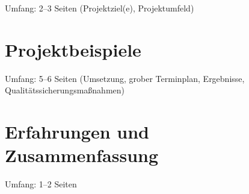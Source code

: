 \documentclass[type=internship,theme=fhooe24,language=german,titlelanguage=german,smartquotes]{hgbthesis}
\begin{document}
Umfang: 2--3 Seiten (Projektziel(e), Projektumfeld)

     
\chapter{Projektbeispiele}

Umfang: 5--6 Seiten (Umsetzung, grober Terminplan, Ergebnisse,
Qualitätssicherungsmaßnahmen)


\chapter{Erfahrungen und Zusammenfassung}

Umfang: 1--2 Seiten


\end{document}
